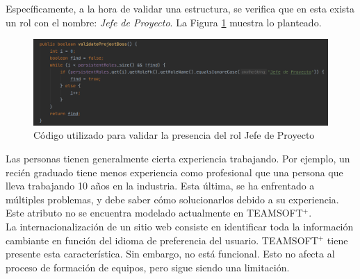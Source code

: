 Específicamente, a la hora de validar una estructura, se verifica que en esta exista un rol con el nombre: \textit{Jefe de Proyecto}. La Figura \ref{fig:cod-valida} muestra lo planteado.

\begin{figure}[H]
	\centering
	\includegraphics[width=\textwidth]{figuras/validate-state.png}
	\caption{Código utilizado para validar la presencia del rol Jefe de Proyecto} \label{fig:cod-valida}
\end{figure}


Las personas tienen generalmente cierta experiencia trabajando. Por ejemplo, un recién graduado tiene menos experiencia como profesional que una persona que lleva trabajando 10 años en la industria. Esta última, se ha enfrentado a múltiples problemas, y debe saber cómo solucionarlos debido a su experiencia. Este atributo no se encuentra modelado actualmente en TEAMSOFT$^+$. \\ 

La internacionalización de un sitio web consiste en identificar toda la información cambiante en función del idioma de preferencia del usuario. TEAMSOFT$^+$ tiene presente esta característica. Sin embargo, no está funcional. Esto no afecta al proceso de formación de equipos, pero sigue siendo una limitación.

